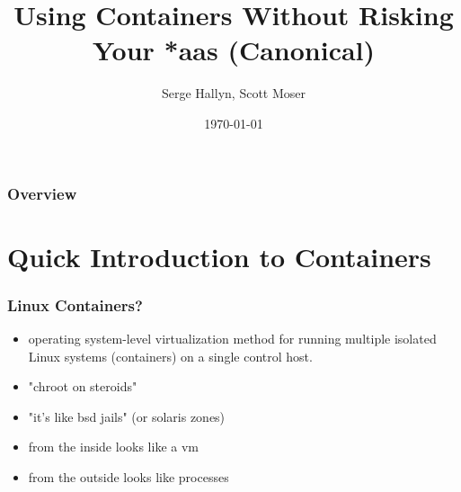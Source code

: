 \documentclass{beamer}
\title[User Namespaces]{Using Containers Without Risking Your *aas (Canonical) } %
\author{Serge Hallyn, Scott Moser} %
\institute[Canonical] %
{
Canonical, Inc \\ %
\medskip
\textit{serge.hallyn@ubuntu.com, scott.moser@canonical.com} %
}
\date{\today} %
\begin{document}
\begin{frame}
\titlepage %
\end{frame}

\begin{frame}
\frametitle{Overview} %
\tableofcontents %
\end{frame}


\section{Quick Introduction to Containers}
\begin{frame}
   \frametitle{Linux Containers?}
   \begin{itemize}
      \item operating system-level virtualization method for running multiple isolated Linux systems (containers) on a single control host.
      \item "chroot on steroids"
      \item "it's like bsd jails" (or solaris zones)
      \item from the inside looks like a vm
      \item from the outside looks like processes
    \end{itemize}
\end{frame}

\end{document}
